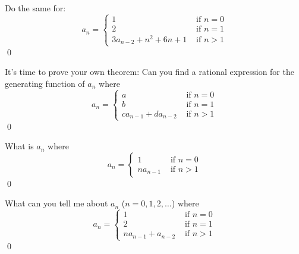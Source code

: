 \newpage
\begin{ex}
Do the same for:
\[
a_n = 
\begin{cases}
1 &\text{ if } n = 0 \\
2 &\text{ if } n = 1 \\
3a_{n-2} + n^2 + 6n + 1 &\text{ if } n > 1
\end{cases}
\]
\qed
\end{ex}


\newpage
\begin{ex}
It's time to prove your own theorem:
Can you find a rational expression for the generating
function of $a_n$ where
\[
a_n = 
\begin{cases}
a &\text{ if } n = 0 \\
b &\text{ if } n = 1 \\
ca_{n-1} + da_{n-2} & \text{ if } n > 1
\end{cases}
\]
\qed
\end{ex}


\newpage
\begin{ex}
What is $a_n$ where
\[
a_n = 
\begin{cases}
1 &\text{ if } n = 0 \\
na_{n-1} & \text{ if } n > 1
\end{cases}
\]
\qed
\end{ex}


\newpage
\begin{ex}
What can you tell me about $a_n$ ($n=0, 1, 2, \ldots$) where
\[
a_n = 
\begin{cases}
1 &\text{ if } n = 0 \\
2 &\text{ if } n = 1 \\
na_{n-1} + a_{n-2} & \text{ if } n > 1
\end{cases}
\]
\qed
\end{ex}

